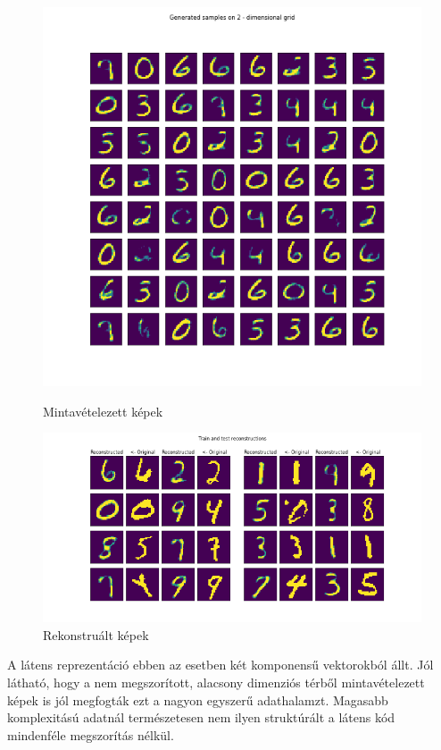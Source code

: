 \documentclass[12pt, english]{article}
\begin{document}
\begin{figure}[H] 
  \label{fig:auto_encoder_results} 
  \begin{minipage}{0.48\linewidth}
    \centering
    \includegraphics[width=.65\linewidth]{gen/generated_samples_mnist_auto_encoder.png} 
    \caption{Mintavételezett képek} 
  \end{minipage}\hfill
  \begin{minipage}{0.48\linewidth}
    \centering
    \includegraphics[width=.95\linewidth]{reco/reconstrunction_samples_mnist_auto_encoder.png} 
    \caption{Rekonstruált képek} 
  \end{minipage} 
\end{figure}

\vspace{4mm}

\par A látens reprezentáció ebben az esetben két komponensű vektorokból állt. Jól látható, hogy a nem megszorított, alacsony dimenziós térből mintavételezett képek is jól megfogták ezt a nagyon egyszerű adathalamzt. Magasabb komplexitású adatnál természetesen nem ilyen struktúrált a látens kód mindenféle megszorítás nélkül.
\end{document}
